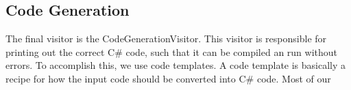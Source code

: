 \subsection{Code Generation}
The final visitor is the CodeGenerationVisitor. 
This visitor is responsible for printing out the correct C\# code, such that it can be compiled an run without errors. 
To accomplish this, we use code templates. \newline
A code template is basically a recipe for how the input code should be converted into C\# code. 
Most of our 